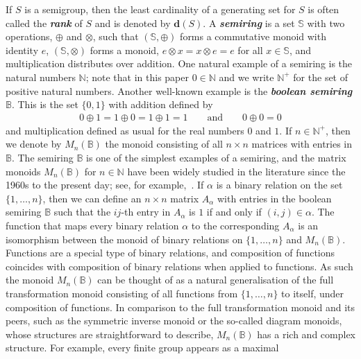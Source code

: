 \documentclass[11pt]{article}
\newcommand{\defn}[1]{\textbf{\textit{#1}}}
\numberwithin{equation}{section}
\newcommand{\B}{\mathbb{B}}
\newcommand{\Bn}{M_n(\B)}
\newcommand{\N}{\mathbb{N}}
\newcommand{\Np}{\N^{+}}
\newcommand{\AND}{\qquad\text{and}\qquad}
\begin{document}
If $S$ is a semigroup, then the least cardinality of a generating set for $S$ is
often called the \defn{rank} of $S$ and is denoted by $\mathbf{d}(S)$. 
A \defn{semiring} is a set $\mathbb{S}$ with two operations, $\oplus$ and $\otimes$,
such that $(\mathbb{S}, \oplus)$ forms a commutative monoid with identity $e$,
$(\mathbb{S}, \otimes)$ forms a monoid, $e\otimes x = x\otimes e = e$ for all $x
\in \mathbb{S}$, and multiplication distributes over addition. One natural
example of a semiring is the natural numbers $\N$; note that in this paper $0
\in \N$ and we write $\Np$ for the set of positive natural numbers.
Another well-known example is the \defn{boolean semiring} $\B$. This is the set
$\{0, 1\}$ with addition defined by 
\begin{align*}
  0 \oplus 1 = 1 \oplus 0 = 1 \oplus 1 = 1 \AND
  0 \oplus 0 = 0
\end{align*}
and multiplication defined as usual for the real numbers $0$ and $1$. If $n\in
\Np$, then we denote by $\Bn$ the monoid consisting of all $n\times n$ matrices
with entries in $\B$.
The semiring $\B$ is one of the simplest examples of a semiring, and the matrix
monoids $\Bn$ for $n \in \N$ have been widely studied in the literature since
the 1960s to the present day;
see, for example,~\cite{Breen2001aa, Breen1997aa, Butler1974aa, Caen1981aa, Cho1993aa,
  Cho1993ab, Fenner2018aa, Kim1982aa, Konieczny1992aa, Li1995aa, Plemmons1970aa,
  Plemmons1970ab, Roush1977aa, Schwarz1973aa, Shaofang1998aa, Tan2000aa,
  Zivkovic2006aa}. If $\alpha$ is a binary relation on the set $\{1, \ldots,
  n\}$, then we can define an $n\times n$ matrix $A_{\alpha}$ with entries in
the boolean semiring $\B$ such that the $ij$-th entry in $A_{\alpha}$ is $1$ if
and only if $(i, j) \in \alpha$. The function that maps every binary relation
$\alpha$ to the corresponding $A_{\alpha}$ is an isomorphism  between the monoid
of binary relations on $\{1,  \ldots, n\}$ and $\Bn$. Functions are a special
type of binary relations, and composition of functions coincides with
composition of binary relations when applied to functions.  As such the monoid
$\Bn$ can be thought of as a natural generalisation of the full transformation
monoid consisting of all functions from $\{1, \ldots, n\}$ to itself,
under composition of functions.  In comparison to the full transformation monoid
and its peers, such as the symmetric inverse monoid or the so-called diagram
monoids, whose structures are straightforward to describe, $\Bn$ has a rich and
complex structure.  For example, every finite group appears as a maximal
\end{document}
